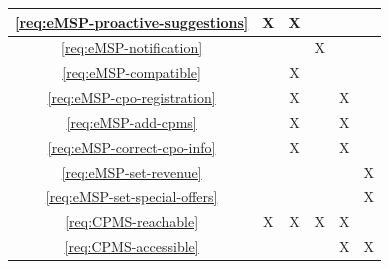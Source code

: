 \begin{table}[h]
\begin{center}
\begin{tabular}{|c||c|c|c|c|c|}
            \ref{req:eMSP-proactive-suggestions} & X                               & X                              &                              &                                &                                \\\hline
            \ref{req:eMSP-notification}          &                                 &                                & X                            &                                &                                \\\hline
            \ref{req:eMSP-compatible}            &                                 & X                              &                              &                                &                                \\\hline
            \ref{req:eMSP-cpo-registration}      &                                 & X                              &                              & X                              &                                \\\hline
            \ref{req:eMSP-add-cpms}              &                                 & X                              &                              & X                              &                                \\\hline
            \ref{req:eMSP-correct-cpo-info}      &                                 & X                              &                              & X                              &                                \\\hline
            \ref{req:eMSP-set-revenue}           &                                 &                                &                              &                                & X                              \\\hline
            \ref{req:eMSP-set-special-offers}    &                                 &                                &                              &                                & X                              \\\hline
            \ref{req:CPMS-reachable}             & X                               & X                              & X                            & X                              &                                \\\hline
            \ref{req:CPMS-accessible}            &                                 &                                &                              & X                              & X                              \\\hline

\end{tabular}
\end{center}
\end{table}
